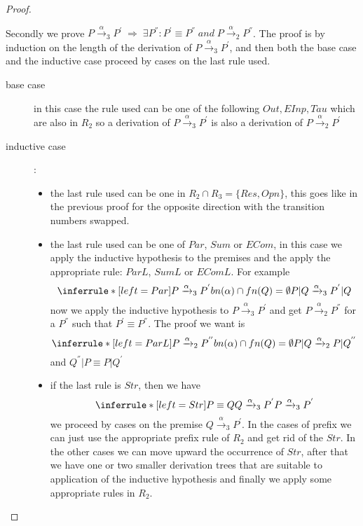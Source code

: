 \begin{theorem}
\begin{proof}
\begin{description}
	Secondly we prove $P\xrightarrow{\alpha}_{3}P^{'}\; \Rightarrow\; \exists P^{''}: P^{'}\equiv P^{''}\; and\; P\xrightarrow{\alpha}_{2}P^{''}$. The proof is by induction on the length of the derivation of $P\xrightarrow{\alpha}_{3}P^{'}$, and then both the base case and the inductive case proceed by cases on the last rule used.
	\begin{description}
	  \item[base case]
	    in this case the rule used can be one of the following $Out, EInp, Tau$ which are also in $R_{2}$ so a derivation of $P\xrightarrow{\alpha}_{3}P^{'}$ is also a derivation of $P\xrightarrow{\alpha}_{2}P^{'}$
	  \item[inductive case]:
	    \begin{itemize}
	      \item 
		the last rule used can be one in $R_{2}\cap R_{3}=\{Res, Opn\}$, this goes like in the previous proof for the opposite direction with the transition numbers swapped.
	      \item
		the last rule used can be one of $Par$, $Sum$ or $ECom$, in this case we apply the inductive hypothesis to the premises and the apply the appropriate rule: $ParL$, $SumL$ or $EComL$. For example
		\[
		  \inferrule* [left=Par]{
		      P\xrightarrow{\alpha}_{3}P^{'}
		    \\
		      bn(\alpha)\cap fn(Q)=\emptyset
		  }{
		      P|Q\xrightarrow{\alpha}_{3}P^{'}|Q
		  }
		\]	
		now we apply the inductive hypothesis to $P\xrightarrow{\alpha}_{3}P^{'}$ and get $P\xrightarrow{\alpha}_{2}P^{''}$ for a $P^{''}$ such that $P^{'}\equiv P^{''}$. The proof we want is
		\[
		      \inferrule* [left=ParL]{
			  P\xrightarrow{\alpha}_{2}P^{''}
			\\
			  bn(\alpha)\cap fn(Q)=\emptyset
		      }{
			  P|Q\xrightarrow{\alpha}_{2}P|Q^{''}
		      }
		\]
		and $Q^{''}|P\equiv P|Q^{'}$
	      \item
		if the last rule is $Str$, then we have
		\[
		  \inferrule* [left=Str]{
		      P\equiv Q
		    \\
		      Q\xrightarrow{\alpha}_{3}P^{'}
		  }{
		    P\xrightarrow{\alpha}_{3}P^{'}
		  }
		\]
		we proceed by cases on the premise $Q\xrightarrow{\alpha}_{3}P^{'}$. In the cases of prefix we can just use the appropriate prefix rule of $R_{2}$ and get rid of the $Str$. In the other cases we can move upward the occurrence of $Str$, after that we have one or two smaller derivation trees that are suitable to application of the inductive hypothesis and finally we apply some appropriate rules in $R_{2}$.

\end{itemize}
\end{description}
\end{description}
\end{proof}
\end{theorem}
